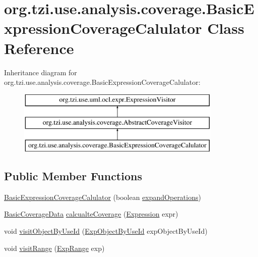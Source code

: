 \hypertarget{classorg_1_1tzi_1_1use_1_1analysis_1_1coverage_1_1_basic_expression_coverage_calulator}{\section{org.\-tzi.\-use.\-analysis.\-coverage.\-Basic\-Expression\-Coverage\-Calulator Class Reference}
\label{classorg_1_1tzi_1_1use_1_1analysis_1_1coverage_1_1_basic_expression_coverage_calulator}
}
Inheritance diagram for org.\-tzi.\-use.\-analysis.\-coverage.\-Basic\-Expression\-Coverage\-Calulator\-:\begin{figure}[H]
\begin{center}
\leavevmode
\includegraphics[height=3.000000cm]{classorg_1_1tzi_1_1use_1_1analysis_1_1coverage_1_1_basic_expression_coverage_calulator}
\end{center}
\end{figure}
\subsection*{Public Member Functions}
\begin{DoxyCompactItemize}
\item 
\hyperlink{classorg_1_1tzi_1_1use_1_1analysis_1_1coverage_1_1_basic_expression_coverage_calulator_aa733f12504bf1de1ba4c2f89b8fd6707}{Basic\-Expression\-Coverage\-Calulator} (boolean \hyperlink{classorg_1_1tzi_1_1use_1_1analysis_1_1coverage_1_1_abstract_coverage_visitor_a2686463cc149dcb3cfc8c1efb80a69c2}{expand\-Operations})
\item 
\hyperlink{classorg_1_1tzi_1_1use_1_1analysis_1_1coverage_1_1_basic_coverage_data}{Basic\-Coverage\-Data} \hyperlink{classorg_1_1tzi_1_1use_1_1analysis_1_1coverage_1_1_basic_expression_coverage_calulator_aae5b5310aeede70df69cd23c2db2be54}{calcualte\-Coverage} (\hyperlink{classorg_1_1tzi_1_1use_1_1uml_1_1ocl_1_1expr_1_1_expression}{Expression} expr)
\item 
void \hyperlink{classorg_1_1tzi_1_1use_1_1analysis_1_1coverage_1_1_basic_expression_coverage_calulator_a4b8c441c6e6e86aed74585cc990b9764}{visit\-Object\-By\-Use\-Id} (\hyperlink{classorg_1_1tzi_1_1use_1_1uml_1_1ocl_1_1expr_1_1_exp_object_by_use_id}{Exp\-Object\-By\-Use\-Id} exp\-Object\-By\-Use\-Id)
\item 
void \hyperlink{classorg_1_1tzi_1_1use_1_1analysis_1_1coverage_1_1_basic_expression_coverage_calulator_aa2920f5ddb5c290238429c8f6703b58c}{visit\-Range} (\hyperlink{classorg_1_1tzi_1_1use_1_1uml_1_1ocl_1_1expr_1_1_exp_range}{Exp\-Range} exp)
\end{DoxyCompactItemize}
